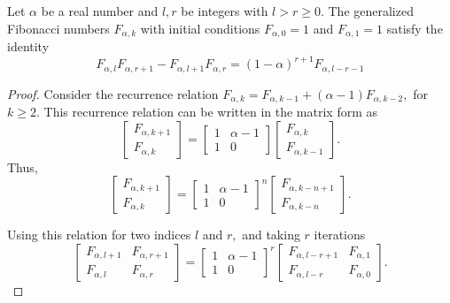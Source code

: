 \documentclass[10pt,a4paper]{amsart}
\begin{document}
	\begin{lem}\label{docagnes identity}
		Let $\alpha $ be a real number and  $ l, r$ be integers with $ l>r \geq 0.$  The generalized Fibonacci numbers $F_{\alpha,k}$ with initial conditions $F_{\alpha, 0} = 1$ and $F_{\alpha, 1}= 1$ satisfy the identity
		\[
		F_{\alpha,l} F_{\alpha,r+1} - F_{\alpha,l+1} F_{\alpha,r}
		= (1-\alpha)^{r+1} F_{\alpha,l-r-1}
		\]
	\end{lem}

	\begin{proof} 
		Consider the recurrence relation $F_{\alpha,k} = F_{\alpha,k-1} + (\alpha-1)F_{\alpha,k-2},$ for $k \geq 2.$
		This recurrence relation can be written in the matrix form as
		\[
		\begin{bmatrix}
			F_{\alpha,k+1} \\
			F_{\alpha,k}
		\end{bmatrix}
		=
		\begin{bmatrix}
			1 & \alpha-1 \\
			1 & 0
		\end{bmatrix}
		\begin{bmatrix}
			F_{\alpha,k} \\
			F_{\alpha,k-1}
		\end{bmatrix}.
		\]
		Thus,
		\[
		\begin{bmatrix}
			F_{\alpha,k+1} \\
			F_{\alpha,k}
		\end{bmatrix}
		=
		\begin{bmatrix}
			1 & \alpha-1 \\
			1 & 0
		\end{bmatrix}^{n}
		\begin{bmatrix}
			F_{\alpha,k-n+1} \\
			F_{\alpha,k-n}
		\end{bmatrix}.
		\]
		
		Using this relation for two indices $l$ and $r,$ and taking $r$ iterations
		\[
		\begin{bmatrix}
			F_{\alpha,l+1} & F_{\alpha,r+1} \\
			F_{\alpha,l}   & F_{\alpha,r}
		\end{bmatrix}
		=
		\begin{bmatrix}
			1 & \alpha-1 \\
			1 & 0
		\end{bmatrix}^{r}
		\begin{bmatrix}
			F_{\alpha,l-r+1} & F_{\alpha,1} \\
			F_{\alpha,l-r}   & F_{\alpha,0}
		\end{bmatrix}.
		\]
		

\end{proof}
\end{document}

